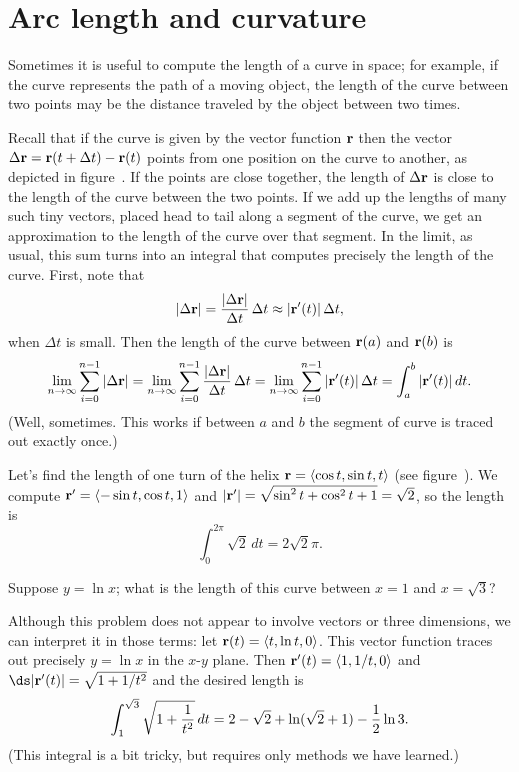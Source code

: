 \section{Arc length and curvature}{}{}
\label{sec:arc length 3D}

Sometimes it is useful to compute the length of a curve in space; for
example, if the curve represents the path of a moving object, the
length of the curve between two points may be the distance traveled by
the object between two times.

Recall that if the curve is given by the vector function $\bf r$ then
the vector $\Delta {\bf r}=
{\bf r}(t+\Delta t)-{\bf r}(t)$ points from one position
on the curve to another, as depicted in figure~. If the points are close together, the length of 
$\Delta {\bf r}$ is close to the length of the
curve between the two points. If we add up the lengths of many such
tiny vectors, placed head to tail along a segment of the curve, we get
an approximation to the length of the curve over that segment. In the
limit, as usual, this sum turns into an integral that computes precisely
the length of the curve. 
First, note that 
$$|\Delta {\bf r}|={|\Delta {\bf r}|\over \Delta t}\,\Delta t\approx
|{\bf r}'(t)|\,\Delta t,$$
when $\Delta t$ is small.
Then the length of the curve between
${\bf r}(a)$ and ${\bf r}(b)$ is 
$$\lim_{n\to\infty} \sum_{i=0}^{n-1}|\Delta {\bf r}|
=\lim_{n\to\infty} \sum_{i=0}^{n-1} {|\Delta {\bf r}|\over \Delta t}\,\Delta t
=\lim_{n\to\infty} \sum_{i=0}^{n-1} |{\bf r}'(t)|\,\Delta t=
\int_a^b|{\bf r}'(t)|\,dt.$$
(Well, sometimes. This works if between $a$ and $b$ the segment of curve
is traced out exactly once.)

\begin{example} Let's find the length of one turn of the helix
${\bf r}=\langle \cos t, \sin t, t\rangle$ (see figure~).
We compute ${\bf r}'=\langle -\sin t, \cos t, 1\rangle$ and
$|{\bf r}'|=\sqrt{\sin^2 t+\cos^2 t+1}=\sqrt2$, so the length is
$$\int_0^{2\pi} \sqrt2\,dt = 2\sqrt2\pi.$$
\vskip-10pt
\end{example}

\begin{example} Suppose $y=\ln x$; what is the length of this curve between
$x=1$ and $x=\sqrt3$?

Although this problem does not appear to involve vectors or three
dimensions, we can interpret it in those terms: let 
${\bf r}(t)=\langle t,\ln t,0\rangle$. This vector function traces
out precisely $y=\ln x$ in the $x$-$y$ plane. Then 
${\bf r}'(t)=\langle 1,1/t,0\rangle$ and
$\ds |{\bf r}'(t)|=\sqrt{1+1/t^2}$ and the desired length is
$$\int_1^{\sqrt3} \sqrt{1+{1\over
    t^2}}\,dt=2-\sqrt2+\ln(\sqrt2+1)-{1\over2}\ln3.$$
(This integral is a bit tricky, but requires only methods we have
learned.) 
\end{example}

